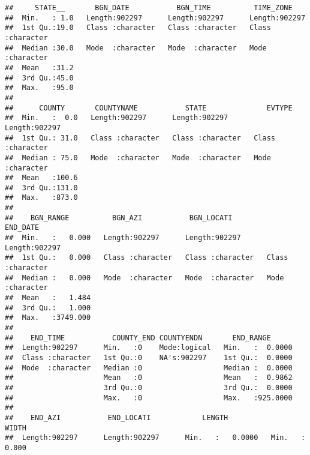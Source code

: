 \documentclass[
]{article}
\begin{document}
\begin{verbatim}
##     STATE__       BGN_DATE           BGN_TIME          TIME_ZONE        
##  Min.   : 1.0   Length:902297      Length:902297      Length:902297     
##  1st Qu.:19.0   Class :character   Class :character   Class :character  
##  Median :30.0   Mode  :character   Mode  :character   Mode  :character  
##  Mean   :31.2                                                           
##  3rd Qu.:45.0                                                           
##  Max.   :95.0                                                           
##                                                                         
##      COUNTY       COUNTYNAME           STATE              EVTYPE         
##  Min.   :  0.0   Length:902297      Length:902297      Length:902297     
##  1st Qu.: 31.0   Class :character   Class :character   Class :character  
##  Median : 75.0   Mode  :character   Mode  :character   Mode  :character  
##  Mean   :100.6                                                           
##  3rd Qu.:131.0                                                           
##  Max.   :873.0                                                           
##                                                                          
##    BGN_RANGE          BGN_AZI           BGN_LOCATI          END_DATE        
##  Min.   :   0.000   Length:902297      Length:902297      Length:902297     
##  1st Qu.:   0.000   Class :character   Class :character   Class :character  
##  Median :   0.000   Mode  :character   Mode  :character   Mode  :character  
##  Mean   :   1.484                                                           
##  3rd Qu.:   1.000                                                           
##  Max.   :3749.000                                                           
##                                                                             
##    END_TIME           COUNTY_END COUNTYENDN       END_RANGE       
##  Length:902297      Min.   :0    Mode:logical   Min.   :  0.0000  
##  Class :character   1st Qu.:0    NA's:902297    1st Qu.:  0.0000  
##  Mode  :character   Median :0                   Median :  0.0000  
##                     Mean   :0                   Mean   :  0.9862  
##                     3rd Qu.:0                   3rd Qu.:  0.0000  
##                     Max.   :0                   Max.   :925.0000  
##                                                                   
##    END_AZI           END_LOCATI            LENGTH              WIDTH         
##  Length:902297      Length:902297      Min.   :   0.0000   Min.   :   0.000  

\end{verbatim}
\end{document}

